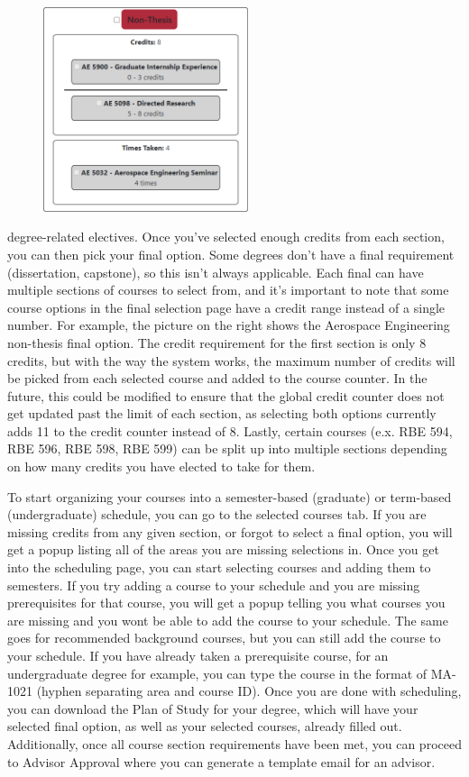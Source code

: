 \documentclass[12pt]{article}
\begin{document}
			\begin{figure}
				\centering
				\vspace*{-1.2cm}\includegraphics[width=6cm]{creditexample}
			\end{figure}degree-related electives. Once you've selected enough credits from each section, you can then pick your final option. Some degrees don't have a final requirement (dissertation, capstone), so this isn't always applicable. Each final can have multiple sections of courses to select from, and it's important to note that some course options in the final selection page have a credit range instead of a single number. For example, the picture on the right shows the Aerospace Engineering non-thesis final option. The credit requirement for the first section is only 8 credits, but with the way the system works, the maximum number of credits will be picked from each selected course and added to the course counter. In the future, this could be modified to ensure that the global credit counter does not get updated past the limit of each section, as selecting both options currently adds 11 to the credit counter instead of 8. Lastly, certain courses (e.x. RBE 594, RBE 596, RBE 598, RBE 599) can be split up into multiple sections depending on how many credits you have elected to take for them.
			\par			
			To start organizing your courses into a semester-based (graduate) or term-based (undergraduate) schedule, you can go to the selected courses tab. If you are missing credits from any given section, or forgot to select a final option, you will get a popup listing all of the areas you are missing selections in. Once you get into the scheduling page, you can start selecting courses and adding them to semesters. If you try adding a course to your schedule and you are missing prerequisites for that course, you will get a popup telling you what courses you are missing and you wont be able to add the course to your schedule. The same goes for recommended background courses, but you can still add the course to your schedule. If you have already taken a prerequisite course, for an undergraduate degree for example, you can type the course in the format of MA-1021 (hyphen separating area and course ID). Once you are done with scheduling, you can download the Plan of Study for your degree, which will have your selected final option, as well as your selected courses, already filled out. Additionally, once all course section requirements have been met, you can proceed to Advisor Approval where you can generate a template email for an advisor.
				
\end{document}
